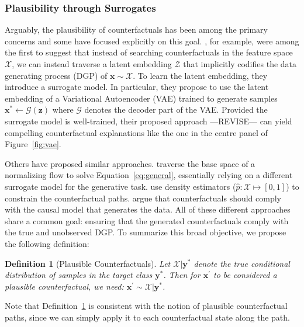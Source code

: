 \documentclass{article}
\newtheorem{definition}{Definition}[section]
\begin{document}
\subsubsection{Plausibility through Surrogates}

Arguably, the plausibility of counterfactuals has been among the primary concerns and some have focused explicitly on this goal. \citet{joshi2019realistic}, for example, were among the first to suggest that instead of searching counterfactuals in the feature space $\mathcal{X}$, we can instead traverse a latent embedding $\mathcal{Z}$ that implicitly codifies the data generating process (DGP) of $\mathbf{x}\sim\mathcal{X}$. To learn the latent embedding, they introduce a surrogate model. In particular, they propose to use the latent embedding of a Variational Autoencoder (VAE) trained to generate samples $\mathbf{x}^* \leftarrow \mathcal{G}(\mathbf{z})$ where $\mathcal{G}$ denotes the decoder part of the VAE. Provided the surrogate model is well-trained, their proposed approach ---REVISE--- can yield compelling counterfactual explanations like the one in the centre panel of Figure~\ref{fig:vae}. 

Others have proposed similar approaches. \citet{dombrowski2021diffeomorphic} traverse the base space of a normalizing flow to solve Equation~\ref{eq:general}, essentially relying on a different surrogate model for the generative task. \citet{poyiadzi2020face} use density estimators ($\hat{p}: \mathcal{X} \mapsto [0,1]$) to constrain the counterfactual paths. \citet{karimi2021algorithmic} argue that counterfactuals should comply with the causal model that generates the data. All of these different approaches share a common goal: ensuring that the generated counterfactuals comply with the true and unobserved DGP. To summarize this broad objective, we propose the following definition:

\begin{definition}[Plausible Counterfactuals]
  \label{def:plausible}
  Let $\mathcal{X}|\mathbf{y}^*$ denote the true conditional distribution of samples in the target class $\mathbf{y}^*$. Then for $\mathbf{x}^{\prime}$ to be considered a plausible counterfactual, we need: $\mathbf{x}^{\prime} \sim \mathcal{X}|\mathbf{y}^*$.
\end{definition}

Note that Definition~\ref{def:plausible} is consistent with the notion of plausible counterfactual paths, since we can simply apply it to each counterfactual state along the path.
\end{document}
